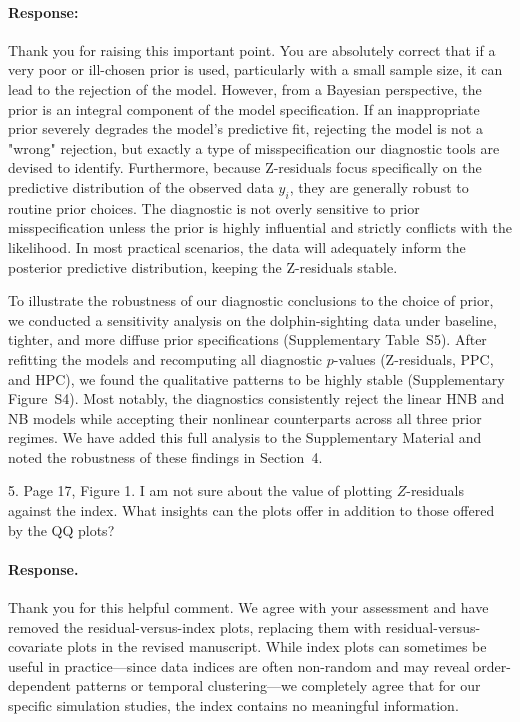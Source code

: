\documentclass[11pt]{article}
\newcommand*{\mybox}[2]{\colorbox{#1!30}{\parbox{.98\linewidth}{#2}}}
\begin{document}
\paragraph{Response:}

Thank you for raising this important point. You are absolutely correct that if a very poor or ill-chosen prior is used, particularly with a small sample size, it can lead to the rejection of the model. However, from a Bayesian perspective, the prior is an integral component of the model specification. If an inappropriate prior severely degrades the model's predictive fit, rejecting the model is not a "wrong" rejection, but exactly a type of misspecification our diagnostic tools are devised to identify. Furthermore, because Z-residuals focus specifically on the predictive distribution of the observed data $y_i$, they are generally robust to routine prior choices. The diagnostic is not overly sensitive to prior misspecification unless the prior is highly influential and strictly conflicts with the likelihood. In most practical scenarios, the data will adequately inform the posterior predictive distribution, keeping the Z-residuals stable.


To illustrate the robustness of our diagnostic conclusions to the choice of prior, we conducted a sensitivity analysis on the dolphin-sighting data under baseline, tighter, and more diffuse prior specifications (Supplementary Table~S5). After refitting the models and recomputing all diagnostic $p$-values (Z-residuals, PPC, and HPC), we found the qualitative patterns to be highly stable (Supplementary Figure~S4). Most notably, the diagnostics consistently reject the linear HNB and NB models while accepting their nonlinear counterparts across all three prior regimes. We have added this full analysis to the Supplementary Material and noted the robustness of these findings in Section~4.

\medskip

\mybox{gray}{5. Page 17, Figure 1. I am not sure about the value of plotting $Z$-residuals against the index. What insights can the plots offer in addition to those offered by the QQ plots?}

\paragraph{Response.}
Thank you for this helpful comment. We agree with your assessment and have removed the residual-versus-index plots, replacing them with residual-versus-covariate plots in the revised manuscript. While index plots can sometimes be useful in practice—since data indices are often non-random and may reveal order-dependent patterns or temporal clustering—we completely agree that for our specific simulation studies, the index contains no meaningful information.
\end{document}

